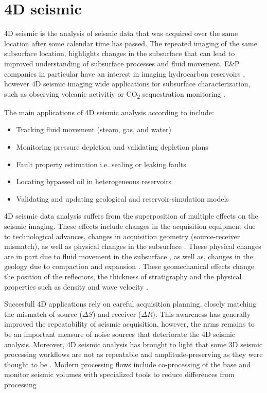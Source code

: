 \section{4D seismic}

4D seismic is the analysis of seismic data that was acquired over the same location after some calendar time has passed. The repeated imaging of the same subsurface location, highlights changes in the subsurface that can lead to improved understanding of subsurface processes and fluid movement. E\&P companies in particular have an interest in imaging hydrocarbon reservoirs \citep{Johnston2013-jg}, however 4D seismic imaging wide applications for subsurface characterization, such as observing volcanic activitiy \citep{londono20184d} or CO\textsubscript{2} sequestration monitoring \citep{Arts2004-ym}. 

The main applications of 4D seismic analysis according to \citet{Yilmaz2003-hp,Johnston2013-qg} include:
\begin{itemize}
\item Tracking fluid movement (steam, gas, and water)
\item Monitoring pressure depletion and validating depletion plans
\item Fault property estimation i.e. sealing or leaking faults
\item Locating bypassed oil in heterogeneous reservoirs
\item Validating and updating geological and reservoir-simulation models
\end{itemize}

4D seismic data analysis suffers from the superposition of multiple effects on the seismic imaging. These effects include changes in the acquisition equipment due to technological advances, changes in acquisition geometry (source-receiver mismatch), as well as physical changes in the subsurface \citep{Yilmaz2003-hp, Johnston2013-jg}. These physical changes are in part due to fluid movement in the subsurface \citep{lumley1995seismic}, as well as, changes in the geology due to compaction and expansion \citep{Hatchell2005-op}. These geomechanical effects change the position of the reflectors, the thickness of stratigraphy and the physical properties such as density and wave velocity \citep{Herwanger2015-qz}.

Succesfull 4D applications rely on careful acquisition planning, closely matching the mismatch of source ($\Delta S$) and receiver ($\Delta R$). This awareness has generally improved the repeatability of seismic acquisition, however, the \ac{nrms} remains to be an important measure of noise sources that deteriorate the 4D seismic analysis. Moreover, 4D seismic analysis has brought to light that some 3D seismic processing workflows are not as repeatable and amplitude-preserving as they were thought to be \citep{Lumley2001-kx}. Modern processing flows include co-processing of the base and monitor seismic volumes with specialized tools to reduce differences from processing \citep{Johnston2013-qg}.

